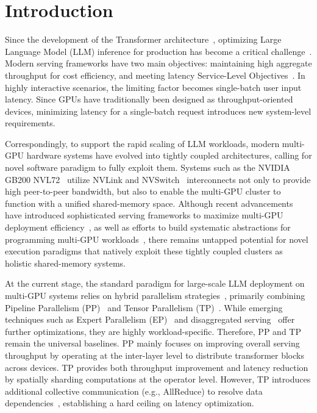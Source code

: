 \section{Introduction} %

Since the development of the Transformer architecture~\cite{vaswani2017attention, kaplan2020scaling}, optimizing Large Language Model (LLM) inference for production has become a critical challenge~\cite{2025taming}. Modern serving frameworks have two main objectives: maintaining high aggregate throughput for cost efficiency, and meeting latency Service-Level Objectives~\cite{agrawal2024sarathi}. In highly interactive scenarios, the limiting factor becomes single-batch user input latency. Since GPUs have traditionally been designed as throughput-oriented devices, minimizing latency for a single-batch request introduces new system-level requirements.

Correspondingly, to support the rapid scaling of LLM workloads, modern multi-GPU hardware systems have evolved into tightly coupled architectures, calling for novel software paradigm to fully exploit them. Systems such as the NVIDIA GB200 NVL72~\cite{nvidia2024gb200nvl72} utilize NVLink and NVSwitch~\cite{nvidia2024nvlink} interconnects not only to provide high peer-to-peer bandwidth, but also to enable the multi-GPU cluster to function with a unified shared-memory space. Although recent advancements have introduced sophisticated serving frameworks to maximize multi-GPU deployment efficiency~\cite{kwon2023vllm, zheng2023sglang, llmd2025, aibrix2025, nvidia2025dynamo}, as well as efforts to build systematic abstractions for programming multi-GPU workloads~\cite{sul2025parallelkittens, heldens2022lightning}, there remains untapped potential for novel execution paradigms that natively exploit these tightly coupled clusters as holistic shared-memory systems.

At the current stage, the standard paradigm for large-scale LLM deployment on multi-GPU systems relies on hybrid parallelism strategies~\cite{smith2022megatron, zheng2022alpa, narayanan2021efficient, qi2025synergistic}, primarily combining Pipeline Parallelism (PP)~\cite{huang2019gpipe, narayanan2019pipedream} and Tensor Parallelism (TP)~\cite{shoeybi2019megatron}. While emerging techniques such as Expert Parallelism (EP)~\cite{gale2023megablocks} and disaggregated serving~\cite{zhong2024distserve} offer further optimizations, they are highly workload-specific. Therefore, PP and TP remain the universal baselines. PP mainly focuses on improving overall serving throughput by operating at the inter-layer level to distribute transformer blocks across devices. TP provides both throughput improvement and latency reduction by spatially sharding computations at the operator level. However, TP introduces additional collective communication (e.g., AllReduce) to resolve data dependencies~\cite{zheng2022alpa}, establishing a hard ceiling on latency optimization.

